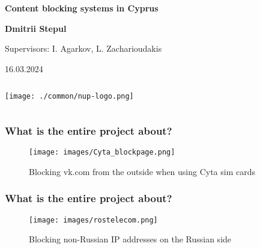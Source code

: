 \documentclass[12pt,aspectratio=169,hyperref={pdftex,unicode},xcolor=dvipsnames]{beamer}
\institute
{
    \begin{columns}
        \begin{column}{2.5cm}
            \includegraphics[height=30mm,keepaspectraticommon/nup-icon.png]
        \end{column}
        \begin{column}{3cm}
            Neapolis University Paphos
        \end{column}
    \end{columns}
}
\begin{document}
  \begin{frame}[plain]
        \begin{left}

        {\Large\textbf{Content blocking systems in Cyprus}}

            \vspace{5mm}
            \textbf{Dmitrii Stepul}

            {\small Supervisors: I. Agarkov, L. Zacharioudakis}

            \vspace{10mm}
            16.03.2024
        \end{left}

        \vspace{10mm}

        \begin{column}{1cm}
            \texttt{[image: ./common/nup-logo.png]}
        \end{column}
    \end{frame}


    
\begin{frame}
    \frametitle{What is the entire project about?}
    \begin{figure}
    \centering
    \begin{center}
        \texttt{[image: images/Cyta\_blockpage.png]}
    \end{center}
    \caption{Blocking vk.com from the outside when using Cyta sim cards}
    \end{figure}
\end{frame}



\begin{frame}
    \frametitle{What is the entire project about?}
    
          \begin{figure}
    \begin{center}
            \centering\texttt{[image: images/rostelecom.png]}
    \end{center}
    \caption{Blocking non-Russian IP addresses on the Russian side}
    \label{fig:russian_blockage}
    \end{figure}
\end{frame}
\end{document}
